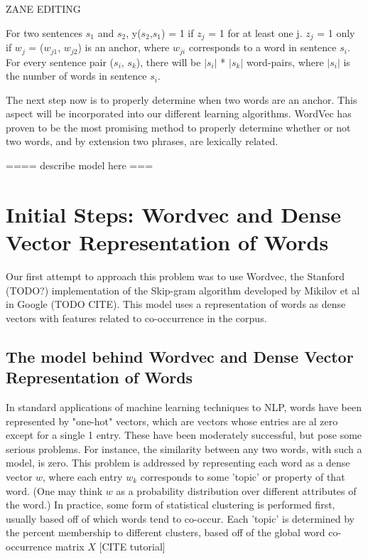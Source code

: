 \documentclass[conference]{IEEEtran}
\begin{document}
 ZANE EDITING

For two sentences $s_{1}$ and $s_{2}$, y($s_{2}$,$s_{1}$) = 1 
if $z_{j}$ = 1 for at least one j. $z_{j}$ = 1 only if $w_{j}$ = ($w_{j1}$, $w_{j2}$) is an anchor, where $w_{ji}$ corresponds to a word in sentence $s_{i}$. For every sentence pair ($s_{i}$, $s_{k}$), there will be $|s_{i}|$ * $|s_{k}|$ word-pairs, where $|s_{i}|$ is the number of words in sentence $s_{i}$. \medskip

The next step now is to properly determine when two words are an anchor. This aspect will be incorporated into our different learning algorithms. WordVec has proven to be the most promising method to properly determine whether or not two words, and by extension two phrases, are lexically related. 



 ==== describe model here ===
 
\section{Initial Steps: Wordvec and Dense Vector Representation of Words}
Our first attempt to approach this problem was to use Wordvec, the Stanford (TODO?) implementation of the Skip-gram algorithm developed by Mikilov et al in Google (TODO CITE). This model uses a representation of words as dense vectors with features related to co-occurrence in the corpus.

\subsection{The model behind Wordvec and Dense Vector Representation of Words}
In standard applications of machine learning techniques to NLP, words have been represented by "one-hot" vectors, which are vectors whose entries are al zero except for a single 1 entry. These have been moderately successful, but pose some serious problems. For instance, the similarity between any two words, with such a model, is zero. This problem is addressed by representing each word as a dense vector $w$, where each entry $w_k$ corresponds to some 'topic' or property of that word. (One may think $w$ as a probability distribution over different attributes of the word.) In practice, some form of statistical clustering is performed first, usually based off of which words tend to co-occur. Each 'topic' is determined by the percent membership to different clusters, based off of the global word co-occurrence matrix $X$ [CITE tutorial]
\\
\end{document}
